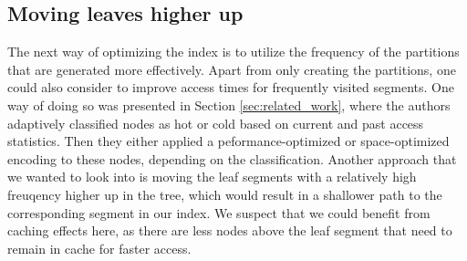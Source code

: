 \subsection{Moving leaves higher up}
The next way of optimizing the index is to utilize the frequency of the partitions that are generated more effectively. Apart from only creating the partitions, one could also consider to improve access times for frequently visited segments. One way of doing so was presented in Section \ref{sec:related_work}, where
the authors adaptively classified nodes as hot or cold based on current and past access statistics. Then they either applied a peformance-optimized or space-optimized encoding to these nodes, depending on the classification. Another approach that we wanted to look into is moving the leaf segments with a relatively high freuqency higher up in the tree, which would result in a shallower path to the corresponding segment in our index. We suspect that we could benefit from caching effects here, as there are less nodes above the leaf segment that need to remain in cache for faster access. 